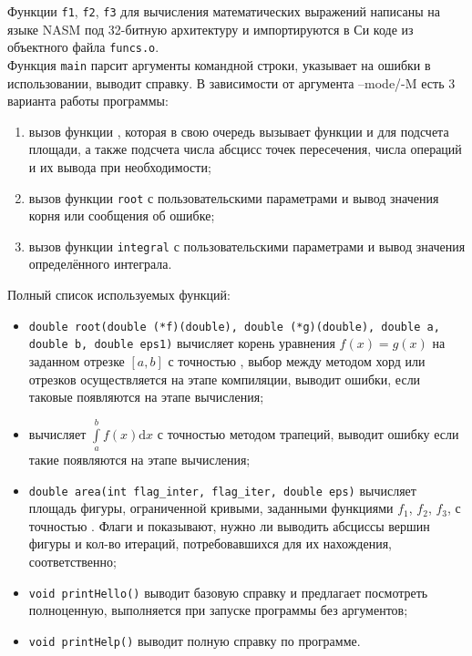 \documentclass[a4paper,12pt,titlepage,finall]{article}
\begin{document}
Функции \texttt{f1}, \texttt{f2}, \texttt{f3} для вычисления математических выражений написаны на языке NASM под 32-битную архитектуру и импортируются в Си коде из объектного файла \texttt{funcs.o}.\\

Функция \texttt{main} парсит аргументы командной строки, указывает на ошибки в использовании, выводит справку. В зависимости от аргумента --mode/-M есть 3 варианта работы программы:
\begin{enumerate}
\item вызов функции , которая в свою очередь вызывает функции  и  для подсчета площади, а также подсчета числа абсцисс точек пересечения, числа операций и их вывода при необходимости;
\item вызов функции \texttt{root} с пользовательскими параметрами и вывод значения корня или сообщения об ошибке;
\item вызов функции \texttt{integral} с пользовательскими параметрами и вывод значения определённого интеграла.
\end{enumerate}

Полный список используемых функций:
\begin{itemize}
\item \texttt{double root(double (*f)(double), double (*g)(double), double a, double b, double eps1)} вычисляет корень уравнения $f(x) = g(x)$ на заданном отрезке $[a, b]$ с точностью , выбор между методом хорд или отрезков осуществляется на этапе компиляции, выводит ошибки, если таковые появляются на этапе вычисления;
\item {} вычисляет $\int \limits_a^b f(x) \mathrm{d}x$ с точностью  методом трапеций, выводит ошибку если такие появляются на этапе вычисления;
\item \texttt{double area(int flag\_inter, flag\_iter, double eps)} вычисляет площадь фигуры, ограниченной кривыми, заданными функциями $f_1$, $f_2$, $f_3$, с точностью . Флаги  и  показывают, нужно ли выводить абсциссы вершин фигуры и кол-во итераций, потребовавшихся для их нахождения, соответственно;
\item \texttt{void printHello()} выводит базовую справку и предлагает посмотреть полноценную, выполняется при запуске программы без аргументов;
\item \texttt{void printHelp()} выводит полную справку по программе.
\end{itemize}
\end{document}
